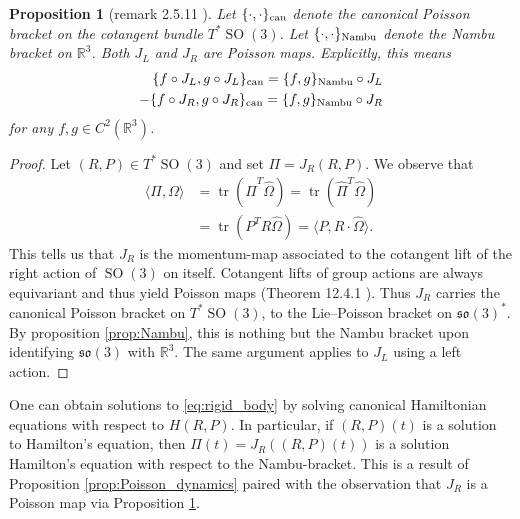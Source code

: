 \documentclass[12pt]{amsart}
\newcommand{\so}{\ensuremath{\mathfrak{so}}}
\newtheorem{prop}[thm]{Proposition}
\DeclareMathOperator{\SO}{SO}
\DeclareMathOperator{\tr}{tr}
\begin{document}
  \begin{prop}[remark 2.5.11 \cite{HolmBook2}] \label{prop:SO3_to_Nambu}
    Let $\{ \cdot , \cdot \}_{\rm can}$ denote the canonical Poisson bracket
    on the cotangent bundle $T^* \SO(3)$.
    Let $\{ \cdot , \cdot \}_{\rm Nambu}$ denote the Nambu bracket on $\mathbb{R}^3$.
    Both $J_L$ and $J_R$ are Poisson maps.
    Explicitly, this means
    \begin{align*}
      \{ f \circ J_L , g \circ J_L \}_{\rm can} = \{ f , g \}_{\rm Nambu} \circ J_L \\
      - \{ f \circ J_R , g \circ J_R \}_{\rm can} = \{ f , g \}_{\rm Nambu} \circ J_R \\
    \end{align*}
    for any $f,g \in C^2( \mathbb{R}^3)$.
  \end{prop}
  \begin{proof}
    Let $(R,P) \in T^* \SO(3)$ and set $\Pi = J_R(R,P)$.
    We observe that
    \begin{align*}
      \langle \Pi , \Omega \rangle &= \tr( \hat{\Pi}^T \hat{\Omega} )
      = \tr( \hat{\Pi}^T \hat{\Omega} ) \\
      &= \tr( P^T R \hat{\Omega} ) 
      = \langle P , R \cdot \hat{\Omega} \rangle.
    \end{align*}
    This tells us that $J_R$ is the momentum-map associated
    to the cotangent lift of the right action of $\SO(3)$ on itself.
    Cotangent lifts of group actions are always equivariant
    and thus yield Poisson maps (Theorem 12.4.1 \cite{MandS}).
    Thus $J_R$ carries the canonical
    Poisson bracket on $T^* \SO(3)$, to the Lie--Poisson
    bracket on $\so(3)^*$.
    By proposition \ref{prop:Nambu}, this is nothing but the
    Nambu bracket upon identifying $\so(3)$ with $\mathbb{R}^3$.
    The same argument applies to $J_L$ using a left action.
  \end{proof}

  One can obtain solutions to \eqref{eq:rigid_body}
  by solving canonical Hamiltonian equations with respect to $H(R,P)$.
  In particular, if $(R,P)(t)$ is a solution to Hamilton's equation,
  then $\Pi(t) = J_R( (R,P)(t))$ is a solution Hamilton's equation
  with respect to the Nambu-bracket.
  This is a result of Proposition \ref{prop:Poisson_dynamics}
  paired with the observation that $J_R$ is a Poisson map via
  Proposition \ref{prop:SO3_to_Nambu}.
\end{document}
